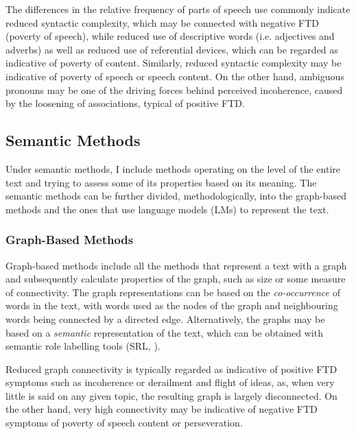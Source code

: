 The differences in the relative frequency of parts of speech use commonly indicate reduced syntactic complexity, which may be connected with negative FTD (poverty of speech), while reduced use of descriptive words (i.e. adjectives and adverbs) as well as reduced use of referential devices, which can be regarded as indicative of poverty of content. %
Similarly, reduced syntactic complexity may be indicative of poverty of speech or speech content. On the other hand, ambiguous pronouns may be one of the driving forces behind perceived incoherence, caused by the loosening of associations, typical of positive FTD.

\subsection{Semantic Methods}
Under semantic methods, I include methods operating on the level of the entire text and trying to assess some of its properties based on its meaning. The semantic methods can be further divided, methodologically, into the graph-based methods and the ones that use language models (LMs) to represent the text.


\subsubsection{Graph-Based Methods}
Graph-based methods include all the methods that represent a text with a graph and subsequently calculate properties of the graph, such as size or some measure of connectivity. The graph representations can be based on the \textit{co-occurrence} of words in the text, with words used as the nodes of the graph and neighbouring words being connected by a directed edge. Alternatively, the graphs may be based on a \textit{semantic} representation of the text, which can be obtained with semantic role labelling tools (SRL, \cite{gildea2002automatic}). 


Reduced graph connectivity is typically regarded as indicative of positive FTD symptoms such as incoherence or derailment and flight of ideas, as, when very little is said on any given topic, the resulting graph is largely disconnected. On the other hand, very high connectivity may be indicative of negative FTD symptoms of poverty of speech content or perseveration.

